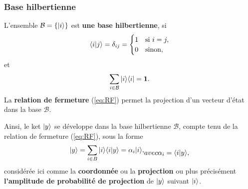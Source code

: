 \subsubsection{Base hilbertienne}

\medskip\colorbox[gray]{0.8}{
\parbox[c]{0.9\textwidth}{
\begin{definition}
L'ensemble $\mathcal{B}=\{\vert i\rangle\}$ est \textbf{une base hilbertienne}, si
\begin{equation}
\langle i\vert j\rangle =\delta_{ij}=\begin{cases}
1 & \text{si }i=j,\\
0 & \text{sinon,}
\end{cases}
\label{eq:dij}
\end{equation}
et
\begin{equation}
\sum_{i\in\mathcal{B}}\vert i\rangle\langle i\vert=\mathbf{1}.
\label{eq:RF}
\end{equation}
La \textbf{relation de fermeture} (\ref{eq:RF}) permet la projection d'un
vecteur d'état dans la base $\mathcal{B}$.
\end{definition}
}}

Ainsi, le ket $\vert y\rangle $ se développe dans la base hilbertienne $\mathcal{B}$,
compte tenu de la relation de fermeture (\ref{eq:RF}), sous la forme%
\begin{subequations}
\begin{align}
\ket{y} =\sum_{i\in B}\ket{i} \langle i\ket{y} =\alpha_{i}\ket{i},
\end{align}
\label{eq:XY}%
avec%
\begin{align}
\alpha_{i}=\langle i\ket{y},
\end{align}
\end{subequations}
considérée ici comme la \textbf{coordonnée} ou la \textbf{projection} ou plus
précisément \textbf{l'amplitude de probabilité de projection} de $\vert y\rangle$
suivant $\vert i\rangle$.

